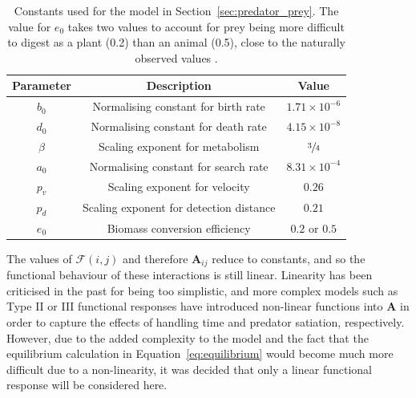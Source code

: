 \begin{table}
  \centering
  \caption[Values of constants used for the model in Section~\ref{sec:predator_prey}]{Constants used for the model in Section~\ref{sec:predator_prey}. The value for $e_0$ takes two values to account for prey being more difficult to digest as a plant (0.2) than an animal (0.5), close to the naturally observed values \cite{Lindeman1942, Kozlovsky1968}.}
  \setlength{\tabcolsep}{1em} %
  {\renewcommand{\arraystretch}{1.25}%
  \begin{tabular}{|c|c|c|}
    \hline
    Parameter & Description & Value
    \\\hline\hline
    $b_0$ & Normalising constant for birth rate & $1.71\times10^{-6}$
    \\\hline
    $d_0$ & Normalising constant for death rate & $4.15\times10^{-8}$
    \\\hline
    $\beta$ & Scaling exponent for metabolism & $\sfrac{3}{4}$
    \\\hline
    $a_0$ & Normalising constant for search rate & $8.31\times10^{-4}$
    \\\hline
    $p_v$ & Scaling exponent for velocity & $0.26$
    \\\hline
    $p_d$ & Scaling exponent for detection distance & $0.21$
    \\\hline
    $e_0$ & Biomass conversion efficiency & $0.2$ or $0.5$
    \\\hline
  \end{tabular}}
  \label{tab:lotka_volterra_constants}
\end{table}

The values of $\mathcal{F}(i,j)$ and therefore $\mathbf{A}_{ij}$ reduce to constants, and so the functional behaviour of these interactions is still linear. Linearity has been criticised in the past for being too simplistic, and more complex models such as Type II or III functional responses \cite{Holling1973} have introduced non-linear functions into $\mathbf{A}$ in order to capture the effects of handling time and predator satiation, respectively.
However, due to the added complexity to the model and the fact that the equilibrium calculation in Equation~\eqref{eq:equilibrium} would become much more difficult due to a non-linearity, it was decided that only a linear functional response will be considered here.

